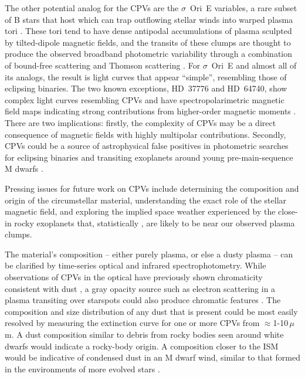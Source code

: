 \documentclass{nature3}
\begin{document}
The other potential analog for the CPVs are the $\sigma$~Ori~E
variables, a rare subset of B stars that host which can trap outflowing stellar winds into
warped plasma tori \cite{Townsend2005,Townsend2008}.  These tori tend
to have dense antipodal accumulations of plasma sculpted by
tilted-dipole magnetic fields, and the transits of
these clumps are thought to produce the observed broadband photometric variability
through a combination of bound-free scattering \cite{Townsend2005} and
Thomson scattering \cite{Berry2022}.  For $\sigma$~Ori~E and almost
all of its analogs, the result is light curves that appear ``simple'',
resembling those of eclipsing binaries.  The two known
exceptions, HD~37776 and HD~64740, show complex light curves
resembling CPVs \cite{Mikulasek2020,Bouma2024} and have
spectropolarimetric magnetic field maps indicating strong
contributions from higher-order magnetic moments
\cite{Kochukhov2011,Shultz2018}.  There are two implications: firstly,
the complexity of CPVs may be a direct consequence of magnetic fields
with highly multipolar contributions.  Secondly, CPVs could be a
source of astrophysical false positives in photometric searches for
eclipsing binaries and transiting exoplanets around young
pre-main-sequence M dwarfs \cite{Johns-Krull2016,Bouma2020}.

Pressing issues for future work on CPVs include determining the
composition and origin of the circumstellar material, understanding
the exact role of the stellar magnetic field, and exploring the
implied space weather experienced by the close-in rocky exoplanets
that, statistically \cite{Dressing2015}, are likely to be near our
observed plasma clumps.

The material's composition -- either purely plasma, or else a dusty
plasma -- can be clarified by time-series optical and infrared
spectrophotometry.  While observations of CPVs in the optical have
previously shown chromaticity consistent with dust \cite{Gunther2022,Koen2023},
a gray opacity source such as electron scattering in a plasma
transiting over starspots could also produce chromatic features
\cite{Rackham2018}.  The composition and size distribution of any dust
that is present could be most easily resolved by measuring the
extinction curve for one or more CPVs from $\approx$1-10\,$\mu$m.  A
dust composition similar to debris from rocky bodies seen around white
dwarfs \cite{Reach2009} would indicate a rocky-body origin.  A 
composition closer to the ISM would be indicative of condensed dust in
an M dwarf wind, similar to that formed in the environments of more
evolved stars \cite{Marigo2008}.
\end{document}
